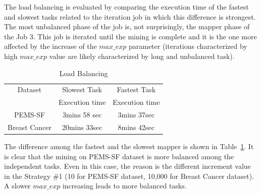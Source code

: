 The load balancing is evaluated by comparing the execution time of the fastest and slowest tasks related to the iteration job in which this difference is strongest. The most unbalanced phase of the job is, not surprisingly, the mapper phase of the Job 3. This job is iterated until the mining is complete and it is the one more affected by the increase of the $max\_exp$ parameter (iterations characterized by high $max\_exp$ value are likely characterized by long and unbalanced task).
\begin{table}
\begin{center}
\caption{Load Balancing}
\label{load balance final}
\begin{tabular}{ | c | c| c| }
\hline
	Dataset						    & Slowest Task & Fastest Task  \\
							    &  Execution time &  Execution time \\ \hline \hline
	PEMS-SF & 3mins 58 sec & 3mins 37sec \\ \hline
	Breast Cancer & 20mins 33sec & 8mins 42sec\\ \hline
\end{tabular}
\end{center}
\end{table}
The difference among the fastest and the slowest mapper is shown in Table~\ref{load balance final}. It is clear that the mining on PEMS-SF dataset is more balanced among the independent tasks. Even in this case, the reason is the different increment value in the Strategy \#1 (10 for PEMS-SF dataset, 10,000 for Breast Cancer dataset). A slower $max\_exp$ increasing leads to more balanced tasks.







